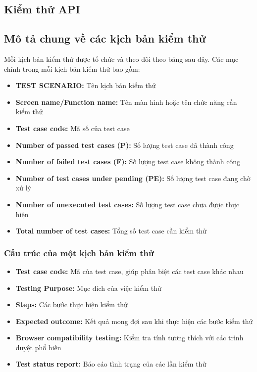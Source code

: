 \subsection{Kiểm thử API}

\subsection{Mô tả chung về các kịch bản kiểm thử}

Mỗi kịch bản kiểm thử được tổ chức và theo dõi theo bảng sau đây. Các mục chính trong mỗi kịch bản kiểm thử bao gồm:
\begin{itemize}
    \item \textbf{TEST SCENARIO:} Tên kịch bản kiểm thử
    \item \textbf{Screen name/Function name:} Tên màn hình hoặc tên chức năng cần kiểm thử
    \item \textbf{Test case code:} Mã số của test case
    \item \textbf{Number of passed test cases (P):} Số lượng test case đã thành công
    \item \textbf{Number of failed test cases (F):} Số lượng test case không thành công
    \item \textbf{Number of test cases under pending (PE):} Số lượng test case đang chờ xử lý
    \item \textbf{Number of unexecuted test cases:} Số lượng test case chưa được thực hiện
    \item \textbf{Total number of test cases:} Tổng số test case cần kiểm thử
\end{itemize}

\subsubsection{Cấu trúc của một kịch bản kiểm thử}

\begin{itemize}
    \item \textbf{Test case code:} Mã của test case, giúp phân biệt các test case khác nhau
    \item \textbf{Testing Purpose:} Mục đích của việc kiểm thử
    \item \textbf{Steps:} Các bước thực hiện kiểm thử
    \item \textbf{Expected outcome:} Kết quả mong đợi sau khi thực hiện các bước kiểm thử
    \item \textbf{Browser compatibility testing:} Kiểm tra tính tương thích với các trình duyệt phổ biến
    \item \textbf{Test status report:} Báo cáo tình trạng của các lần kiểm thử
\end{itemize}

